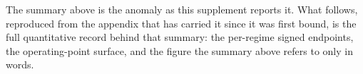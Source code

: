 The summary above is the anomaly as this supplement reports it. What follows, reproduced from the appendix that has carried it since it
was first bound, is the full quantitative record behind that summary: the
per-regime signed endpoints, the operating-point surface, and the figure the
summary above refers to only in words.

\begingroup
\renewcommand{\chapter}[1]{}

\endgroup
